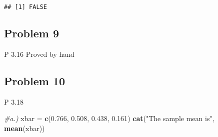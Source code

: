 \documentclass[
]{article}
\newenvironment{Shaded}{\begin{snugshade}}{\end{snugshade}}
\newcommand{\CommentTok}[1]{\textcolor[rgb]{0.56,0.35,0.01}{\textit{#1}}}
\newcommand{\DataTypeTok}[1]{\textcolor[rgb]{0.13,0.29,0.53}{#1}}
\newcommand{\DecValTok}[1]{\textcolor[rgb]{0.00,0.00,0.81}{#1}}
\newcommand{\FloatTok}[1]{\textcolor[rgb]{0.00,0.00,0.81}{#1}}
\newcommand{\KeywordTok}[1]{\textcolor[rgb]{0.13,0.29,0.53}{\textbf{#1}}}
\newcommand{\NormalTok}[1]{#1}
\newcommand{\OperatorTok}[1]{\textcolor[rgb]{0.81,0.36,0.00}{\textbf{#1}}}
\newcommand{\StringTok}[1]{\textcolor[rgb]{0.31,0.60,0.02}{#1}}
\begin{document}
\begin{Shaded}
\end{Shaded}

\begin{verbatim}
## [1] FALSE
\end{verbatim}

\hypertarget{problem-9}{%
\subsection{Problem 9}\label{problem-9}}

P 3.16 Proved by hand

\hypertarget{problem-10}{%
\subsection{Problem 10}\label{problem-10}}

P 3.18

\begin{Shaded}
\begin{Highlighting}[]
\CommentTok{#a.)}
\NormalTok{xbar =}\StringTok{ }\KeywordTok{c}\NormalTok{(}\FloatTok{0.766}\NormalTok{, }\FloatTok{0.508}\NormalTok{, }\FloatTok{0.438}\NormalTok{, }\FloatTok{0.161}\NormalTok{)}
\KeywordTok{cat}\NormalTok{(}\StringTok{"The sample mean is"}\NormalTok{, }\KeywordTok{mean}\NormalTok{(xbar))}
\end{Highlighting}
\end{Shaded}
\end{document}
